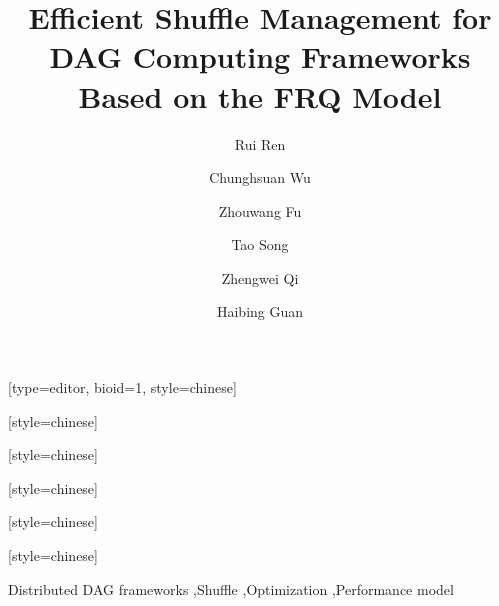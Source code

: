 \documentclass[a4paper,fleqn]{cas-dc}
\begin{document}
\let\WriteBookmarks\relax
\def\floatpagepagefraction{1}
\def\textpagefraction{.001}

\title [mode = title]{Efficient Shuffle Management for DAG Computing Frameworks Based on the FRQ Model}                      






\author[1]{Rui Ren}[type=editor,
                        bioid=1,
                        style=chinese]

\author[1]{Chunghsuan Wu}[style=chinese]
\author[1]{Zhouwang Fu}[style=chinese]
\author[1]{Tao Song}[style=chinese]
\author[1]{Zhengwei Qi}[style=chinese]
\cormark[1]

\author[1]{Haibing Guan}[style=chinese]

\address[1]{Shanghai Jiao Tong University, China}



\begin{keywords}
  Distributed DAG frameworks \sep Shuffle \sep Optimization \sep Performance model
\end{keywords}


\maketitle

\makeatletter
\renewcommand\section{\@startsection{section}{1}{\z@}%
    {15pt \@plus 3\p@ \@minus 3\p@}%
    {4\p@}%
    {%
     \sectionfont\raggedright\hst[13pt]}}
\renewcommand\subsection{\@startsection{subsection}{2}{\z@}%
    {10pt \@plus 3\p@ \@minus 2\p@}%
    {.1\p@}%
    {%
     \ssectionfont\raggedright }}
\renewcommand\subsubsection{\@startsection{subsubsection}{3}{\z@}%
    {10pt \@plus 1\p@ \@minus .3\p@}%
    {.1\p@}%
    {%
     \sssectionfont\raggedright}}
\makeatother
\end{document}
